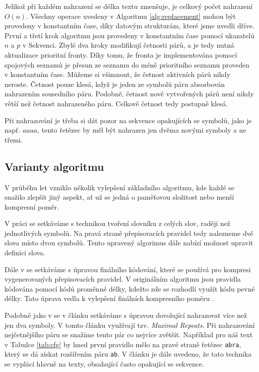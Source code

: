 \documentclass[a4paper,12pt]{article}
\begin{document}
Jelikož při každém nahrazení se délka textu zmenšuje, je celkový počet nahrazení $O(n)$. Všechny operace uvedeny v Algoritmu \ref{alg:replacement} mohou být provedeny v konstantním čase, díky datovým strukturám, které jsme uvedli dříve. První a třetí krok algoritmu jsou provedeny v konstantním čase pomocí ukazatelů $n$ a $p$ v Sekvenci. Zbylé dva kroky modifikují četnosti párů, a je tedy nutná aktualizace prioritní fronty. Díky tomu, že fronta je implementována pomocí spojových seznamů je přesun ze seznamu do méně prioritního seznamu proveden \linebreak v konstantním čase. Můžeme si všimnout, že četnost aktivních párů nikdy neroste. Četnost pouze klesá, když je jeden ze symbolů páru absorbován nahrazením sousedního páru. Podobně, četnost nově vytvořených párů není nikdy větší než četnost nahrazeného páru. Celkově četnost tedy postupně klesá.

Při nahrazování je třeba si dát pozor na sekvence opakujících se symbolů, jako je např. $aaaa$, tento řetězec by měl být nahrazen jen dvěma novými symboly a ne třemi.

\subsection{Varianty algoritmu}
V průběhu let vzniklo několik vylepšení základního algoritmu, kde každé se snažilo zlepšit jiný aspekt, ať už se jedná o paměťovou složitost nebo menší kompresní poměr. 

V práci \cite{wan2003browsing} se setkáváme s technikou tvoření slovníku z celých slov, raději než jednotlivých symbolů. Na pravá straně přepisovacích pravidel tedy nalezneme dvě slova místo dvou symbolů. Tento upravený algorimus dále nabízí možnost upravit definici slova. 

Dále v \cite{yoshida2013effective} se setkáváme s úpravou finálního kódování, které se používá pro kompresi vygenerovaných přepisovacích pravidel. V originálním algoritmu jsou pravidla kódována pomocí kódů proměnné délky, kdežto zde se rozhodli využít kódu pevné délky. Tato úprava vedla k vylepšení finálních kompresního poměru \cite{yoshida2013effective}.

Podobně jako v \cite{wan2003browsing} se v článku \cite{furuya2019mr} setkáváme s úpravou dovolující nahrazovat více než jen dva symboly. V tomto článku využívají tzv. \emph{Maximal Repeats}. Při nahrazování nejčetnějšího páru se snažíme tento pár co nejvíce zvětšit. Například pro náš text v Tabulce \ref{tab:cfg} by hned první pravidlo mělo na pravé straně řetězec \texttt{abra}, který se dá získat rozšířením páru \texttt{ab}. V článku je dále uvedeno, že tato technika se vyplácí hlavně na texty, obsahující často opakující se sekvence.
\end{document}
